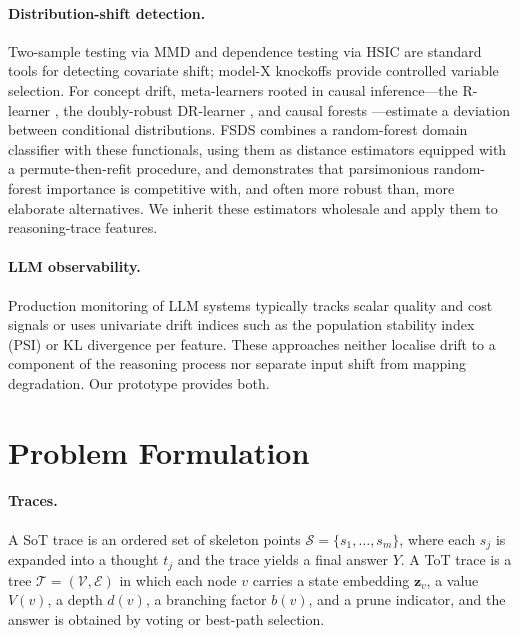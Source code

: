 \documentclass[11pt]{article}
\newcommand{\z}{\mathbf{z}}
\begin{document}
\paragraph{Distribution-shift detection.} Two-sample testing via MMD
\cite{gretton2012mmd} and dependence testing via HSIC \cite{gretton2005hsic} are
standard tools for detecting covariate shift; model-X knockoffs
\cite{candes2018knockoffs} provide controlled variable selection. For concept
drift, meta-learners rooted in causal inference---the R-learner
\cite{nie2021rlearner}, the doubly-robust DR-learner \cite{kennedy2023drlearner},
and causal forests \cite{wager2018causalforest}---estimate a deviation between
conditional distributions. FSDS \cite{fsds2026} combines a random-forest domain
classifier \cite{breiman2001rf} with these functionals, using them as distance
estimators equipped with a permute-then-refit procedure, and demonstrates that
parsimonious random-forest importance is competitive with, and often more robust
than, more elaborate alternatives. We inherit these estimators wholesale and
apply them to reasoning-trace features.

\paragraph{LLM observability.} Production monitoring of LLM systems typically
tracks scalar quality and cost signals or uses univariate drift indices such as
the population stability index (PSI) or KL divergence per feature. These
approaches neither localise drift to a component of the reasoning process nor
separate input shift from mapping degradation. Our prototype provides both.

\section{Problem Formulation}
\label{sec:formulation}

\paragraph{Traces.} A SoT trace is an ordered set of skeleton points
$\mathcal{S}=\{s_1,\dots,s_m\}$, where each $s_j$ is expanded into a thought
$t_j$ and the trace yields a final answer $Y$. A ToT trace is a tree
$\mathcal{T}=(\mathcal{V},\mathcal{E})$ in which each node $v$ carries a state
embedding $\z_v$, a value $V(v)$, a depth $d(v)$, a branching factor $b(v)$, and
a prune indicator, and the answer is obtained by voting or best-path selection.
\end{document}
